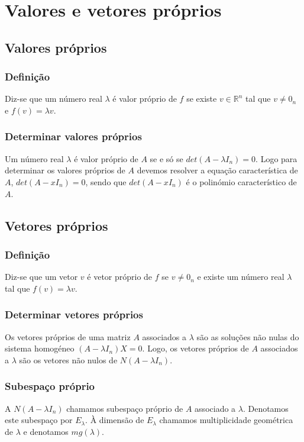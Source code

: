 \documentclass[10pt,a4paper]{report}
\begin{document}
\chapter{Valores e vetores próprios}

\section{Valores próprios}
\subsection{Definição}
Diz-se que um número real $\lambda$ é valor próprio de $f$ se existe $v \in \mathbb{R}^n$ tal que $v \neq 0_n$ e $f(v) = \lambda v$.

\subsection{Determinar valores próprios}
Um número real $\lambda$ é valor próprio de $A$ se e só se $det (A - \lambda I_n) = 0$. Logo para determinar os valores próprios de $A$  devemos resolver a equação característica de $A$, $det(A-xI_n)=0$, sendo que $det(A-xI_n)$ é o polinómio característico de $A$.

\section{Vetores próprios}
\subsection{Definição}
Diz-se que um vetor $v$ é vetor próprio de $f$ se $v \neq 0_n$ e existe um número real $\lambda$ tal que $f(v) = \lambda v$.

\subsection{Determinar vetores próprios}
Os vetores próprios de uma matriz $A$ associados a $\lambda$ são as soluções não nulas do sistema homogéneo $(A-\lambda I_n)X = 0$. Logo, os vetores próprios de $A$ associados a $\lambda$ são os vetores não nulos de $N(A - \lambda I_n)$.

\subsection{Subespaço próprio}
A $N(A-\lambda I_n)$ chamamos subespaço próprio de $A$ associado a $\lambda$. Denotamos este subespaço por $E_\lambda$. À dimensão de $E_\lambda$ chamamos multiplicidade geométrica de $\lambda$ e denotamos $mg(\lambda)$.
\end{document}
